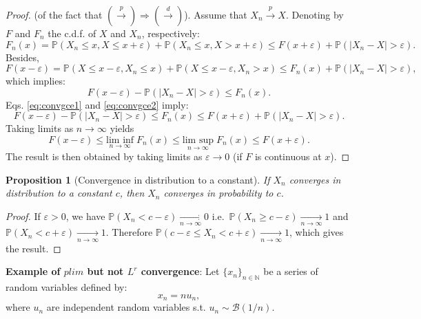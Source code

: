 \documentclass[
]{book}
\newtheorem{proposition}{Proposition}[chapter]
\theoremstyle{definition}
\theoremstyle{definition}
\theoremstyle{definition}
\theoremstyle{definition}
\theoremstyle{remark}
\begin{document}
\begin{proof}
(of the fact that \(\left(\overset{p}{\rightarrow}\right) \Rightarrow \left( \overset{d}{\rightarrow}\right)\)). Assume that \(X_n \overset{p}{\rightarrow} X\). Denoting by \(F\) and \(F_n\) the c.d.f. of \(X\) and \(X_n\), respectively:
\begin{equation}
F_n(x) = \mathbb{P}(X_n \le x,X\le x+\varepsilon) + \mathbb{P}(X_n \le x,X > x+\varepsilon) \le F(x+\varepsilon) + \mathbb{P}(|X_n - X|>\varepsilon).\label{eq:convgce1}
\end{equation}
Besides,
\[
F(x-\varepsilon) = \mathbb{P}(X \le x-\varepsilon,X_n \le x) + \mathbb{P}(X \le x-\varepsilon,X_n > x) \le F_n(x) + \mathbb{P}(|X_n - X|>\varepsilon),
\]
which implies:
\begin{equation}
F(x-\varepsilon) - \mathbb{P}(|X_n - X|>\varepsilon) \le F_n(x).\label{eq:convgce2}
\end{equation}
Eqs. \eqref{eq:convgce1} and \eqref{eq:convgce2} imply:
\[
F(x-\varepsilon) - \mathbb{P}(|X_n - X|>\varepsilon) \le F_n(x)  \le F(x+\varepsilon) + \mathbb{P}(|X_n - X|>\varepsilon).
\]
Taking limits as \(n \rightarrow \infty\) yields
\[
F(x-\varepsilon) \le \underset{n \rightarrow \infty}{\mbox{lim inf}}\; F_n(x) \le \underset{n \rightarrow \infty}{\mbox{lim sup}}\; F_n(x)  \le F(x+\varepsilon).
\]
The result is then obtained by taking limits as \(\varepsilon \rightarrow 0\) (if \(F\) is continuous at \(x\)).
\end{proof}

\begin{proposition}[Convergence in distribution to a constant]
\protect\hypertarget{prp:cvgce11}{}\label{prp:cvgce11}If \(X_n\) converges in distribution to a constant \(c\), then \(X_n\) converges in probability to \(c\).
\end{proposition}

\begin{proof}
If \(\varepsilon>0\), we have \(\mathbb{P}(X_n < c - \varepsilon) \underset{n \rightarrow \infty}{\rightarrow} 0\) i.e.~\(\mathbb{P}(X_n \ge c - \varepsilon) \underset{n \rightarrow \infty}{\rightarrow} 1\) and \(\mathbb{P}(X_n < c + \varepsilon) \underset{n \rightarrow \infty}{\rightarrow} 1\). Therefore \(\mathbb{P}(c - \varepsilon \le X_n < c + \varepsilon) \underset{n \rightarrow \infty}{\rightarrow} 1\),
which gives the result.
\end{proof}

\textbf{Example of \(plim\) but not \(L^r\) convergence}: Let \(\{x_n\}_{n \in \mathbb{N}}\) be a series of random variables defined by:
\[
x_n = n u_n,
\]
where \(u_n\) are independent random variables s.t. \(u_n \sim \mathcal{B}(1/n)\).
\end{document}

